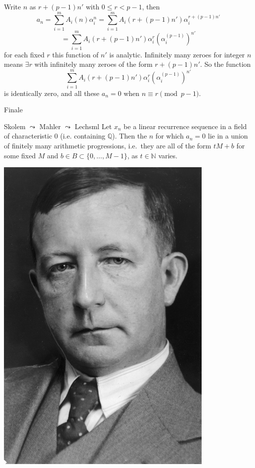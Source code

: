 \documentclass[notheorems]{beamer}
\theoremstyle{plain}
\newcommand{\NN}{\mathbb{N}}
\newcommand{\QQ}{\mathbb Q}
\newcommand{\lt}{<}
\begin{document}
\begin{frame}
    Write \(n\) as \(r + (p-1)n'\) with \(0\le r \lt p-1\)\pause, then
    \begin{equation*}
        a_n = \sum_{i=1}^m A_i(n)\alpha_i^n = \sum_{i=1}^m A_i(r + (p-1)n')\alpha_i^{r + (p-1)n'}
    \end{equation*}
    \begin{equation*}
        = \sum_{i=1}^m A_i(r + (p-1)n')\alpha_i^{r} (\alpha_i^{(p-1)})^{n'}
    \end{equation*}
    for each fixed \(r\) this function of \(n'\) is analytic.
    \pause Infinitely many zeroes for integer \(n\) means \(\exists r\) with infinitely many zeroes of the form \(r + (p-1)n'\). So the function%
    \begin{equation*}
        \sum_{i=1}^m A_i(r + (p-1)n')\alpha_i^{r} (\alpha_i^{(p-1)})^{n'}
    \end{equation*}
    is identically zero, and all these \(a_n = 0\) when \(n \equiv r \pmod{p-1}\).%
    \par
\end{frame}

\begin{frame}{Finale}
    \begin{theorem}{Skolem \(\leadsto\) Mahler \(\leadsto\) Lech}{sml}
        Let $x_n$ be a linear recurrence sequence in a field of characteristic 0 (i.e. containing $\QQ$).
        Then the $n$ for which $a_n = 0$ lie in a union of finitely many arithmetic progressions, i.e.\ they are all of the form \(tM + b\) for some fixed \(M\) and \(b \in B \subset \{0, \ldots, M-1\}\), as \(t \in \NN\) varies.%
    \end{theorem}
    \pause
    \includegraphics[height = 0.6\textheight]{skolem.jpeg}
\end{frame}
\end{document}
